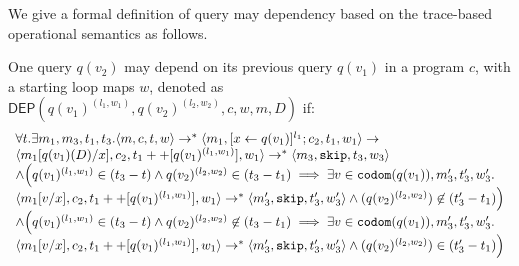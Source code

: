    We give a formal definition of query may dependency based on the trace-based operational semantics as follows.
  \begin{defn}
One query $q(v_2)$ may depend on its previous query $q(v_1)$ in a program $c$, with a starting loop maps $w$, denoted as
$\mathsf{DEP}(q(v_1)^{(l_1, w_1)}, q(v_2)^{(l_2, w_2)}, c,w,m,D)$ if: 
\[
  \begin{array}{l}
     \forall  t. \exists m_1,m_3,t_1,t_3.
\langle m, c,  t,w \rangle \rightarrow^{*} \langle m_1, [\mathrel{ x \leftarrow q(v_1) }]^{l_1} ; c_2,
  t_1,w_1 \rangle \rightarrow \\ \langle m_1[q(v_1)(D)/x], c_2,
  t_1++[q(v_1)^{(l_1, w_1)}], w_1 \rangle \rightarrow^{*} \langle m_3, \mathtt{skip},
  t_3,w_3 \rangle \\  
  \land 
\Big( q(v_1)^{(l_1,w_1)} \in (t_3-t) \land q(v_2)^{(l_2,w_2)} \in (t_3-t_1) \implies  \exists v \in \mathtt{codom}(q(v_1)), m_3', t_3', w_3'.  \\
 \langle m_1[v/x], {c_2}, t_1++[q(v_1)^{(l_1,w_1)}], w_1 \rangle \rightarrow^{*} \langle m_3', \mathtt{skip}, t_3', w_3' \rangle \land (q(v_2)^{(l_2,w_2)}) \not \in (t_3'-t_1)
\Big)\\
\land 
\Big(q(v_1)^{(l_1,w_1)} \in (t_3-t) \land q(v_2)^{(l_2,w_2)} \not\in (t_3-t_1) \implies  \exists v \in \mathtt{codom}(q(v_1)),  m_3', t_3', w_3'. \\
 \langle m_1[v/x], {c_2}, t_1++[q(v_1)^{(l_1,w_1)}], w_1 \rangle \rightarrow^{*} \langle m_3', \mathtt{skip}, t_3', w_3' \rangle \land (q(v_2)^{(l_2,w_2)})  \in (t_3'-t_1)
\Big)
\end{array}
\]
\end{defn}
%
